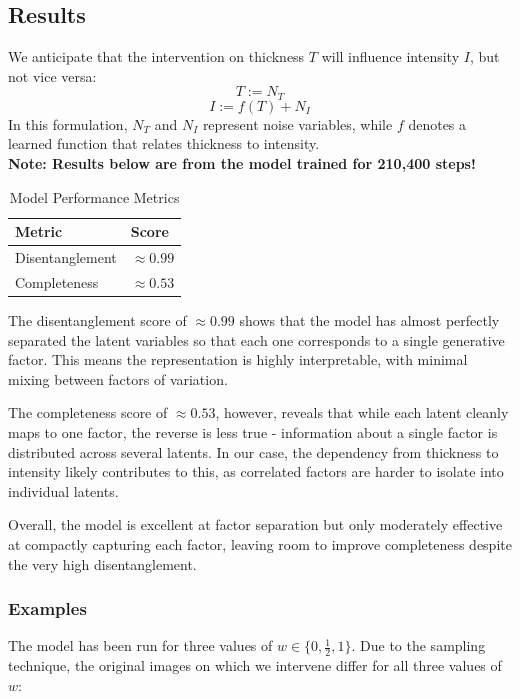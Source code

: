 \documentclass{article}
\begin{document}
	\subsection{Results}
	
	We anticipate that the intervention on thickness $T$ will influence intensity $I$, but not vice versa:
	$$ T := N_T $$
	$$ I := f(T) + N_I $$
	In this formulation, $N_T$ and $N_I$ represent noise variables, while $f$ denotes a learned function that relates thickness to intensity. \\
	
	\textbf{\normalsize Note: Results below are from the model trained for 210,400 steps!}
	
	\begin{table}[h]
		\centering
		\begin{tabular}{@{}ll@{}}
			\toprule
			Metric            & Score \\ \midrule
			Disentanglement   & $\approx 0.99$ \\
			Completeness      & $\approx 0.53$ \\ \bottomrule
		\end{tabular}
		\caption{Model Performance Metrics}
	\end{table}
	
	The disentanglement score of $\approx 0.99$ shows that the model has almost perfectly separated the latent variables so that each one corresponds to a single generative factor. This means the representation is highly interpretable, with minimal mixing between factors of variation.  
	
	The completeness score of $\approx 0.53$, however, reveals that while each latent cleanly maps to one factor, the reverse is less true - information about a single factor is distributed across several latents. In our case, the dependency from thickness to intensity likely contributes to this, as correlated factors are harder to isolate into individual latents.  
	
	Overall, the model is excellent at factor separation but only moderately effective at compactly capturing each factor, leaving room to improve completeness despite the very high disentanglement.
	
	\subsubsection*{Examples}
	
	The model has been run for three values of $w \in \{0, \frac{1}{2}, 1\}$. Due to the sampling technique, the original images on which we intervene differ for all three values of $w$:
	
\end{document}
